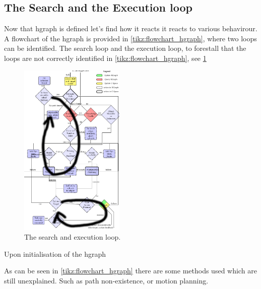 \subsection{The Search and the Execution loop}%
\label{subsec:two_loops}
Now that \ac{hgraph} is defined let's find how it reacts it reacts to various behavirour. A flowchart of the \ac{hgraph} is provided in \cref{tikz:flowchart_hgraph}, where two loops can be identified. The search loop and the execution loop, to forestall that the loops are not correctly identified in \cref{tikz:flowchart_hgraph}, see \cref{fig:two_loops_identified}

\begin{figure}[H]
    \centering
    \includegraphics[width=5cm]{figures/two_loops_identified}
    \caption{The search and execution loop.}
    \label{fig:two_loops_identified}
\end{figure}

Upon initialisation of the \ac{hgraph}






As can be seen in \cref{tikz:flowchart_hgraph} there are some methods used which are still unexplained. Such as path non-existence, or motion planning. 

